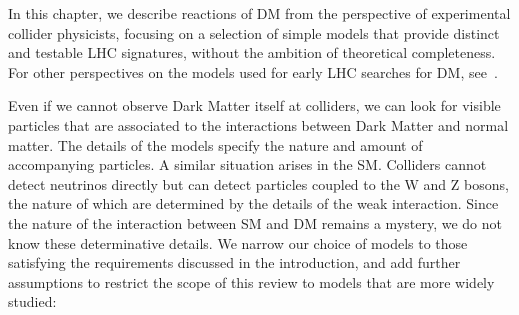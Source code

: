 In this chapter, we describe reactions of DM from the perspective of experimental collider physicists, focusing on a selection of simple models that provide distinct and testable LHC signatures, without the ambition of theoretical completeness. For other perspectives on the models used for early LHC searches for DM, see~\cite{Kahlhoefer:2017dnp,Abercrombie:2015wmb,Arcadi:2017kky,Feng:2010gw}. 

Even if we cannot observe Dark Matter itself at colliders, we can look for visible particles that are associated to the interactions between Dark Matter and normal matter. The details of the models specify the nature and amount of accompanying particles. A similar situation arises in the SM. Colliders cannot detect neutrinos directly but can detect particles coupled to the W and Z bosons, the nature of which are determined by the details of the weak interaction. Since the nature of the interaction between SM and DM remains a mystery, we do not know these determinative details. We narrow our choice of models to those satisfying the requirements discussed in the introduction, and add further assumptions to restrict the scope of this review to models that are more widely studied:

